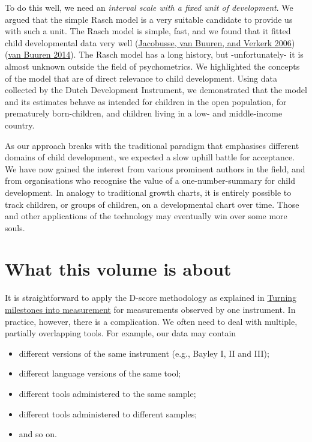 \documentclass[
]{book}
\providecommand{\tightlist}{%
  \setlength{\itemsep}{0pt}\setlength{\parskip}{0pt}}
\begin{document}
To do this well, we need an \emph{interval scale with a fixed unit of development}. We argued that the simple Rasch model is a very suitable candidate to provide us with such a unit. The Rasch model is simple, fast, and we found that it fitted child developmental data very well (\protect\hyperlink{ref-jacobusse2006}{Jacobusse, van Buuren, and Verkerk 2006})(\protect\hyperlink{ref-vanbuuren2014}{van Buuren 2014}). The Rasch model has a long history, but -unfortunately- it is almost unknown outside the field of psychometrics. We highlighted the concepts of the model that are of direct relevance to child development. Using data collected by the Dutch Development Instrument, we demonstrated that the model and its estimates behave as intended for children in the open population, for prematurely born-children, and children living in a low- and middle-income country.

As our approach breaks with the traditional paradigm that emphasises different domains of child development, we expected a slow uphill battle for acceptance. We have now gained the interest from various prominent authors in the field, and from organisations who recognise the value of a one-number-summary for child development. In analogy to traditional growth charts, it is entirely possible to track children, or groups of children, on a developmental chart over time. Those and other applications of the technology may eventually win over some more souls.

\hypertarget{sec:thisvolume}{%
\section{What this volume is about}\label{sec:thisvolume}}

It is straightforward to apply the D-score methodology as explained in \href{https://d-score.org/dbook1}{Turning milestones into measurement} for measurements observed by one instrument. In practice, however, there is a complication. We often need to deal with multiple, partially overlapping tools. For example, our data may contain

\begin{itemize}
\tightlist
\item
  different versions of the same instrument (e.g., Bayley I, II and III);
\item
  different language versions of the same tool;
\item
  different tools administered to the same sample;
\item
  different tools administered to different samples;
\item
  and so on.
\end{itemize}
\end{document}
